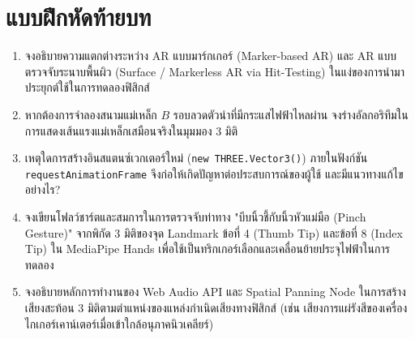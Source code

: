 \section{แบบฝึกหัดท้ายบท}
\begin{enumerate}
    \item จงอธิบายความแตกต่างระหว่าง AR แบบมาร์กเกอร์ (Marker-based AR) และ AR แบบตรวจจับระนาบพื้นผิว (Surface / Markerless AR via Hit-Testing) ในแง่ของการนำมาประยุกต์ใช้ในการทดลองฟิสิกส์
    \item หากต้องการจำลองสนามแม่เหล็ก $B$ รอบลวดตัวนำที่มีกระแสไฟฟ้าไหลผ่าน จงร่างอัลกอริทึมในการแสดงเส้นแรงแม่เหล็กเสมือนจริงในมุมมอง 3 มิติ
    \item เหตุใดการสร้างอินสแตนซ์เวกเตอร์ใหม่ (\texttt{new THREE.Vector3()}) ภายในฟังก์ชัน \texttt{requestAnimationFrame} จึงก่อให้เกิดปัญหาต่อประสบการณ์ของผู้ใช้ และมีแนวทางแก้ไขอย่างไร?
    \item จงเขียนโฟลว์ชาร์ตและสมการในการตรวจจับท่าทาง "บีบนิ้วชี้กับนิ้วหัวแม่มือ (Pinch Gesture)" จากพิกัด 3 มิติของจุด Landmark ข้อที่ 4 (Thumb Tip) และข้อที่ 8 (Index Tip) ใน MediaPipe Hands เพื่อใช้เป็นทริกเกอร์เลือกและเคลื่อนย้ายประจุไฟฟ้าในการทดลอง
    \item จงอธิบายหลักการทำงานของ Web Audio API และ Spatial Panning Node ในการสร้างเสียงสะท้อน 3 มิติตามตำแหน่งของแหล่งกำเนิดเสียงทางฟิสิกส์ (เช่น เสียงการแผ่รังสีของเครื่องไกเกอร์เคาน์เตอร์เมื่อเข้าใกล้อนุภาคนิวเคลียร์)
\end{enumerate}
